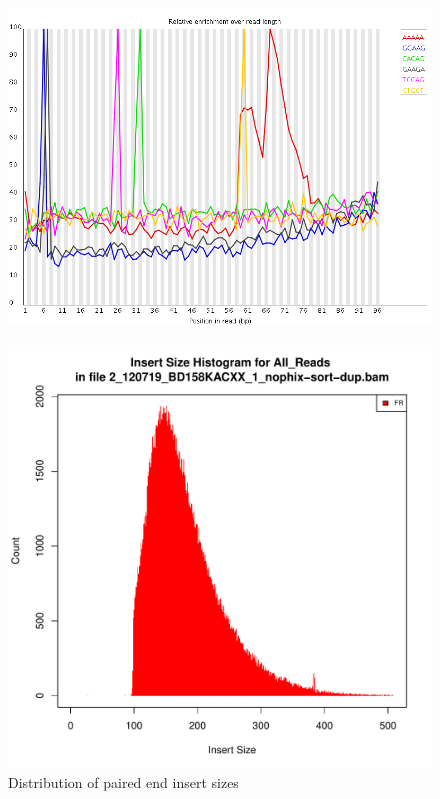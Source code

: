 \documentclass{article}
\begin{document}
    \begin{figure}[htbp]
      \centering
      \includegraphics[width=0.85\linewidth] {fastqc/2_120719_BD158KACXX_1_nophix-sort-dup_fastqc/Images/kmer_profiles.png}
      \caption{}
    \end{figure}
    \begin{figure}[htbp]
      \centering
      \includegraphics[width=0.75\linewidth] {2_120719_BD158KACXX_1_nophix-sort-dup-insert.pdf}
      \caption{Distribution of paired end insert sizes}
    \end{figure}


\FloatBarrier
\FloatBarrier
\end{document}
